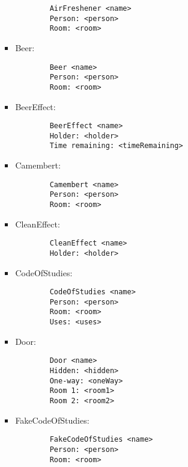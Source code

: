 \begin{itemize}
\begin{itemize}
\begin{itemize}
        \begin{verbatim}
        AirFreshener <name>
        Person: <person>
        Room: <room>
        \end{verbatim}

        \item Beer:

        \begin{verbatim}
        Beer <name>
        Person: <person>
        Room: <room>
        \end{verbatim}

        \item BeerEffect:

        \begin{verbatim}
        BeerEffect <name>
        Holder: <holder>
        Time remaining: <timeRemaining>
        \end{verbatim}

        \item Camembert:

        \begin{verbatim}
        Camembert <name>
        Person: <person>
        Room: <room>
        \end{verbatim}

        \item CleanEffect:

        \begin{verbatim}
        CleanEffect <name>
        Holder: <holder>
        \end{verbatim}

        \item CodeOfStudies:

        \begin{verbatim}
        CodeOfStudies <name>
        Person: <person>
        Room: <room>
        Uses: <uses>
        \end{verbatim}
        
        \item Door:
        
        \begin{verbatim}
        Door <name>
        Hidden: <hidden>
        One-way: <oneWay>
        Room 1: <room1>
        Room 2: <room2>
        \end{verbatim}

        \item FakeCodeOfStudies:

        \begin{verbatim}
        FakeCodeOfStudies <name>
        Person: <person>
        Room: <room>
        \end{verbatim}


\end{itemize}
\end{itemize}
\end{itemize}
